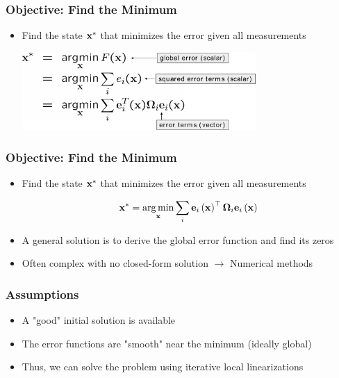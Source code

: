\begin{frame}
    \frametitle{Objective: Find the Minimum}
    
    \begin{itemize}
        \item Find the state $\boldsymbol{\mathbf{x}}^{*}$ that minimizes the error given all measurements
        
        \begin{center}
            \includegraphics[width=0.7\textwidth]{images/find_minimum.pdf}
        \end{center}
    \end{itemize}

\end{frame}

\begin{frame}
    \frametitle{Objective: Find the Minimum}
    
    \begin{itemize}
        \item Find the state $\boldsymbol{\mathbf{x}}^{*}$ that minimizes the error given all measurements
        
        \begin{equation*}
            \boldsymbol{\mathbf{x}}^{*} = \operatorname*{arg\,min}_{\boldsymbol{\mathbf{x}}} \sum_{i} \boldsymbol{\mathbf{e}}_{i}\left( \boldsymbol{\mathbf{x}} \right)^{\top} \boldsymbol{\mathbf{\Omega}}_{i} \boldsymbol{\mathbf{e}}_{i}\left( \boldsymbol{\mathbf{x}} \right)
        \end{equation*}
        
        
        \item A general solution is to derive the global error function and find its zeros
        \item Often complex with no closed-form solution $\rightarrow$ Numerical methods
    \end{itemize}
    
\end{frame}


\begin{frame}
    \frametitle{Assumptions}
    \begin{itemize}
        \item A "good" initial solution is available
        \item The error functions are "smooth" near the minimum (ideally global)
        \item Thus, we can solve the problem using iterative local linearizations
    \end{itemize}

\end{frame}

